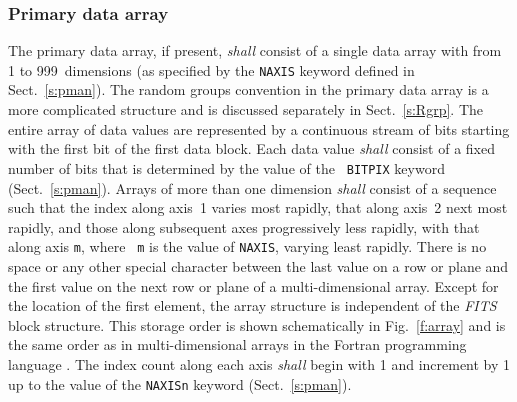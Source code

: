 \documentclass[onecolumn]{aa}
\begin{document}
   \subsubsection{Primary data array}
   The \label{s:pdata} primary data array, if
   present, {\em shall} consist of a  single data array with from 1 to
   999~dimensions (as specified by the {\tt NAXIS} keyword defined in
   Sect.\ \ref{s:pman}).   The random groups convention in the
   primary data array is a  more complicated structure and is discussed
   separately in Sect.\ \ref{s:Rgrp}.  The entire array of data values are
   represented by a continuous stream of  bits starting with the first
   bit of the first data block. Each data value {\em shall} consist of a
   fixed number of bits that is determined by the value of the {\tt
   BITPIX} keyword (Sect.\ \ref{s:pman}).  Arrays of more than
   one dimension {\em shall} consist of
   a sequence such that the index along axis~1 varies most rapidly,
   that along axis~2 next most rapidly, and those along subsequent axes
   progressively less rapidly, with that along axis {\tt m}, where {\tt
   m} is the value  of {\tt NAXIS}, varying least
   rapidly.    There is no space or any other special character between
   the last value on a row or plane and the first value on the  next row or plane
   of a multi-dimensional array. 
   Except for the
   location of the first element, the array structure is independent of 
   the {\em FITS\/} block structure.
   This storage  order
   is shown schematically in  Fig.~\ref{f:array} and is
   the same order as in multi-dimensional arrays in the 
   Fortran  programming language \citep{iso04}.
   The index count along each axis {\em shall} begin 
   with 1 and increment by 1 up to the value of 
   the {\tt NAXISn} keyword (Sect.\ \ref{s:pman}). 
\end{document}
